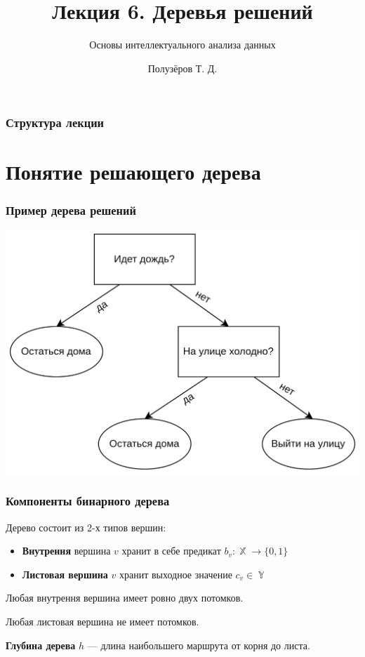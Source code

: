 \documentclass{beamer}
\title[Деревья решений]{Лекция 6. Деревья решений}
\subtitle{Основы интеллектуального анализа данных}
\author{Полузёров Т. Д.}
\institute{БГУ ФПМИ}
\date{}
\DeclareMathOperator{\X}{\mathbb{X}}
\DeclareMathOperator{\Y}{\mathbb{Y}}
\begin{document}
	
	\begin{frame}
		\titlepage
	\end{frame}
	
	
	\begin{center}
		\frametitle{Структура лекции}
		\tableofcontents	
	\end{center}
    
	\section{Понятие решающего дерева}

	\begin{frame}
		\frametitle{Пример дерева решений}
		\includegraphics[width=1\textwidth]{dc}
	\end{frame}

    \begin{frame}
        \frametitle{Компоненты бинарного дерева}

		Дерево состоит из 2-х типов вершин:
		\begin{itemize}
			\item \textbf{Внутрення} вершина $v$ хранит в себе предикат $b_v: \X \rightarrow \{0, 1\}$
			\item \textbf{Листовая вершина} $v$ хранит выходное значение $c_v \in \Y$
		\end{itemize}

		\vspace{15pt}

		Любая внутрення вершина имеет ровно двух потомков.

		Любая листовая вершина не имеет потомков.

		\vspace{15pt}

		\textbf{Глубина дерева} $h$ --- длина наибольшего маршрута от корня до листа.
    \end{frame}
	
\end{document}

